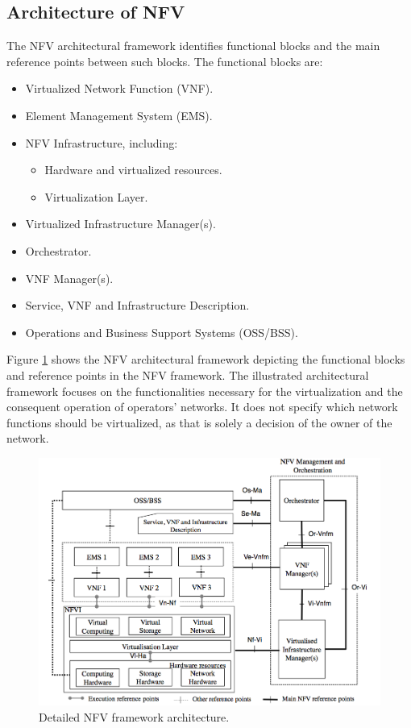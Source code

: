 \subsection{Architecture of NFV}
The NFV architectural framework identifies functional blocks and the main reference points between such blocks. The functional blocks are:
\begin{itemize}
	\item Virtualized Network Function (VNF).
	\item Element Management System (EMS).
	\item NFV Infrastructure, including:
	\begin{itemize}
		\item Hardware and virtualized resources.
		\item Virtualization Layer.
	\end{itemize}
	\item Virtualized Infrastructure Manager(s).
	\item Orchestrator.
	\item VNF Manager(s).
	\item Service, VNF and Infrastructure Description.
	\item Operations and Business Support Systems (OSS/BSS).
\end{itemize}
Figure \ref{fig:etsi_detailed_nfv_framework} shows the NFV architectural framework depicting the functional blocks and reference points in the NFV framework. The illustrated architectural framework focuses on the functionalities necessary for the virtualization and the consequent operation of operators' networks. It does not specify which network functions should be virtualized, as that is solely a decision of the owner of the network.
\begin{figure}[h]
	\centering
	\includegraphics[clip= true, width= \columnwidth]{images/architettura_etsi.png}
	\caption{Detailed NFV framework architecture.}
	\label{fig:etsi_detailed_nfv_framework}
\end{figure}

